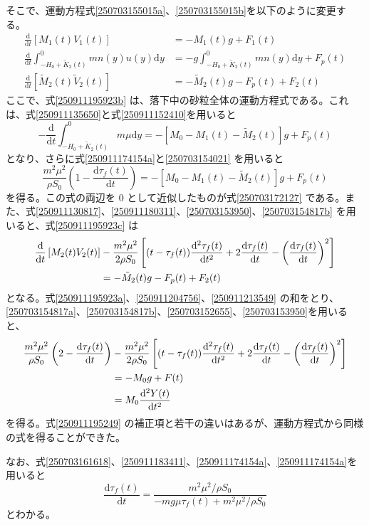 \documentclass[]{article}
\begin{document}
そこで、運動方程式\eqref{250703155015a}、\eqref{250703155015b}を以下のように変更する。
\begin{align}
   \frac{\mathrm{d} }{\mathrm{d} t} \left[M_1(t) V_1(t)\right] &=   - M_1(t) g + F_1(t)  \label{250911195923a} \\
   \frac{\mathrm{d}}{\mathrm{d}t}\int_{-H_0+\tilde{K}_2(t)}^0 m n(y) u(y) \mathrm{d} y &= - g\int_{-H_0+\tilde{K}_2(t)}^0 m n(y) \mathrm{d}y + F_p(t)  \label{250911195923b} \\
   \frac{\mathrm{d} }{\mathrm{d} t} \left[\tilde{M}_2(t) \tilde{V}_2(t) \right]  &=  - \tilde{M}_2(t) g -F_p(t)+ F_2(t) \label{250911195923c} 
\end{align}
ここで、式\eqref{250911195923b} は、落下中の砂粒全体の運動方程式である。これは、式\eqref{250911135650}と式\eqref{250911152410}を用いると
\begin{equation} \label{250911203626}
   -\frac{\mathrm{d}}{\mathrm{d}t}\int_{-H_0+\tilde{K}_2(t)}^0 m \mu \mathrm{d} y = - \left[M_0-M_1(t)-\tilde{M}_2(t)\right] g + F_p(t)
\end{equation}
となり、さらに式\eqref{250911174154a}と\eqref{250703154021} を用いると
\begin{equation} \label{250911204756}
   \frac{m^2\mu^2}{\rho S_0}\left(1-\frac{\mathrm{d}\tau_f(t)}{\mathrm{d}t}\right) = - \left[M_0-M_1(t)-\tilde{M}_2(t)\right] g + F_p(t)
\end{equation}
を得る。この式の両辺を $0$ として近似したものが式\eqref{250703172127} である。また、式\eqref{250911130817}、\eqref{250911180311}、\eqref{250703153950}、\eqref{250703154817b} を用いると、式\eqref{250911195923c} は
\begin{align} \label{250911213549}
   \frac{\mathrm{d} }{\mathrm{d} t} \left[M_2(t) V_2(t) \right] &- \frac{m^2\mu^2}{2\rho S_0}\left[(t-\tau_f(t))\frac{\mathrm{d}^2\tau_f(t)}{\mathrm{d}t^2}+2\frac{\mathrm{d}\tau_f(t)}{\mathrm{d}t}-\left(\frac{\mathrm{d}\tau_f(t)}{\mathrm{d}t}\right)^2\right]\notag\\
    &=  - \tilde{M}_2(t) g -F_p(t)+ F_2(t) 
\end{align}
となる。式\eqref{250911195923a}、\eqref{250911204756}、\eqref{250911213549} の和をとり、\eqref{250703154817a}、\eqref{250703154817b}、\eqref{250703152655}、\eqref{250703153950}を用いると、
\begin{align} \label{250911230907}
   \frac{m^2\mu^2}{\rho S_0}\left(2 - \frac{\mathrm{d}\tau_f(t)}{\mathrm{d}t}\right) &- \frac{m^2\mu^2}{2\rho S_0}\left[(t-\tau_f(t))\frac{\mathrm{d}^2\tau_f(t)}{\mathrm{d}t^2}+2\frac{\mathrm{d}\tau_f(t)}{\mathrm{d}t}-\left(\frac{\mathrm{d}\tau_f(t)}{\mathrm{d}t}\right)^2\right] \notag\\
   & = -M_0 g + F(t) \notag\\
   & =  M_0\frac{\mathrm{d}^2Y(t)}{\mathrm{d}t^2}
\end{align}
を得る。式\eqref{250911195249} の補正項と若干の違いはあるが、運動方程式から同様の式を得ることができた。




なお、式\eqref{250703161618}、\eqref{250911183411}、\eqref{250911174154a}、\eqref{250911174154a}を用いると
\begin{equation} \label{250911232221}
   \frac{\mathrm{d}\tau_f(t)}{\mathrm{d}t} = \frac{m^2\mu^2/\rho S_0}{-mg\mu\tau_f(t)+m^2\mu^2/\rho S_0}
\end{equation}
とわかる。
\end{document}
